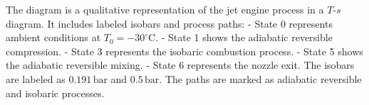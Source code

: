 The diagram is a qualitative representation of the jet engine process in a \( T \)-\( s \) diagram. It includes labeled isobars and process paths:  
- State 0 represents ambient conditions at \( T_0 = -30^\circ\text{C} \).  
- State 1 shows the adiabatic reversible compression.  
- State 3 represents the isobaric combustion process.  
- State 5 shows the adiabatic reversible mixing.  
- State 6 represents the nozzle exit.  
The isobars are labeled as \( 0.191 \, \text{bar} \) and \( 0.5 \, \text{bar} \). The paths are marked as adiabatic reversible and isobaric processes.
